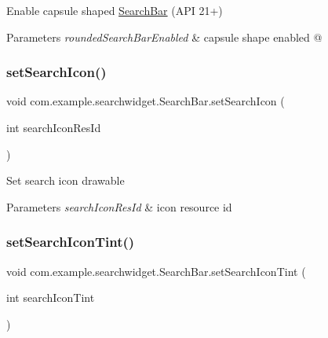 Enable capsule shaped \mbox{\hyperlink{classcom_1_1example_1_1searchwidget_1_1_search_bar}{Search\+Bar}} (A\+PI 21+)


\begin{DoxyParams}{Parameters}
{\em rounded\+Search\+Bar\+Enabled} & capsule shape enabled @ \\
\hline
\end{DoxyParams}
\mbox{\label{classcom_1_1example_1_1searchwidget_1_1_search_bar_a3f9335e4481de2b5db38735df6b19753}} 
\subsubsection{\texorpdfstring{setSearchIcon()}{setSearchIcon()}}
{\footnotesize\ttfamily void com.\+example.\+searchwidget.\+Search\+Bar.\+set\+Search\+Icon (\begin{DoxyParamCaption}\item[{int}]{search\+Icon\+Res\+Id }\end{DoxyParamCaption})}

Set search icon drawable


\begin{DoxyParams}{Parameters}
{\em search\+Icon\+Res\+Id} & icon resource id \\
\hline
\end{DoxyParams}
\mbox{\label{classcom_1_1example_1_1searchwidget_1_1_search_bar_adca3a2ec79965621b5d77a52ecc68c5b}} 
\subsubsection{\texorpdfstring{setSearchIconTint()}{setSearchIconTint()}}
{\footnotesize\ttfamily void com.\+example.\+searchwidget.\+Search\+Bar.\+set\+Search\+Icon\+Tint (\begin{DoxyParamCaption}\item[{int}]{search\+Icon\+Tint }\end{DoxyParamCaption})}

